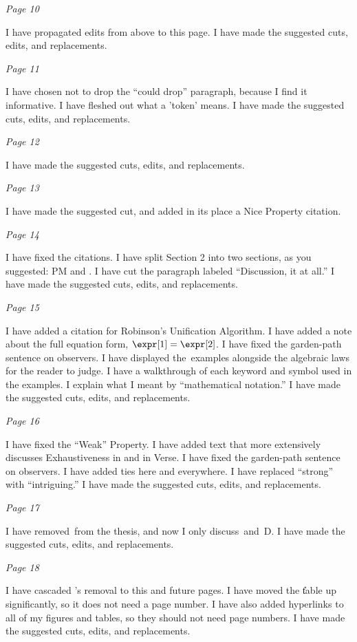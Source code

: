 \documentclass[manuscript,screen, 12pt, nonacm]{acmart}
\begin{document}
\it{Page 10}

I have propagated edits from above to this page. I have made the suggested cuts,
edits, and replacements. 


\it{Page 11}

I have chosen not to drop the “could drop” paragraph, because I find it
informative. I have fleshed out what a 'token' means. I have made the suggested
cuts, edits, and replacements. 

\it{Page 12}

I have made the suggested cuts, edits, and replacements. 

\it{Page 13}

I have made the suggested cut, and added in its place a Nice Property citation.


\it{Page 14}

I have fixed the citations. I have split Section 2 into two sections, as you
suggested: PM and \VC. I have cut the paragraph labeled “Discussion, it at all.”
I have made the suggested cuts, edits, and replacements. 

\it{Page 15}

I have added a citation for Robinson's Unification Algorithm. I have added a
note about the full equation form, $\expr[1] = \expr[2]$. I have fixed the
garden-path sentence on observers. I have displayed the~\VC examples alongside
the algebraic laws for the reader to judge. I have a walkthrough of each keyword
and symbol used in the examples. I explain what I meant by “mathematical notation.”
I have made the suggested cuts, edits, and replacements. 

\it{Page 16}

I have fixed the “Weak” Property. I have added text that more extensively
discusses Exhaustiveness in \VC and in Verse. I have fixed the garden-path
sentence on observers. I have added ties here and everywhere.  I have replaced
“strong” with “intriguing.” I have made the suggested cuts, edits, and
replacements. 

\it{Page 17}

I have removed~\PPlus from the thesis, and now I only discuss~\VMinus and~D. I
have made the suggested cuts, edits, and replacements. 

\it{Page 18}

I have cascaded {\PPlus}'s removal to this and future pages. I have moved the \U
table up significantly, so it does not need a page number. I have also added
hyperlinks to all of my figures and tables, so they should not need page
numbers. I have made the suggested cuts, edits, and replacements. 
\end{document}
